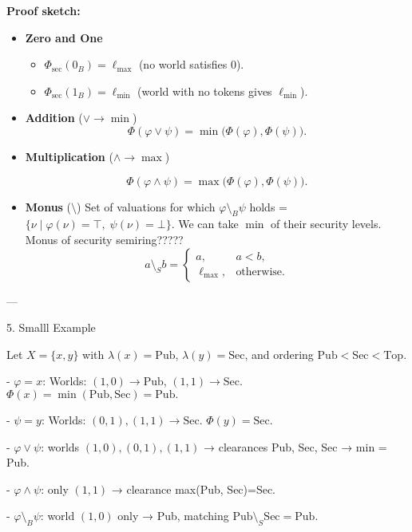 \textbf{Proof sketch:}
\begin{itemize}
    \item \textbf{Zero and One}  
        \begin{itemize}
            \item \(\Phi_{\mathrm{sec}}(0_B)=\ell_{\max}\) (no world satisfies 0).
            \item \(\Phi_{\mathrm{sec}}(1_B)=\ell_{\min}\) (world with no tokens gives \(\ell_{\min}\)).
        \end{itemize}
    \item \textbf{Addition} (\(\vee \to \min\))  
        \[
            \Phi(\varphi\vee\psi)
            = \min\bigl(\Phi(\varphi),\Phi(\psi)\bigr).
        \]
    \item \textbf{Multiplication} (\(\wedge \to \max\))  
        
        \[
            \Phi(\varphi\wedge\psi)
            = \max\bigl(\Phi(\varphi),\Phi(\psi)\bigr).
        \]
    \item \textbf{Monus} (\(\setminus\))  
        Set of valuations for which  \(\varphi\setminus_B\psi\) holds =  
        \(\{\nu \mid \varphi(\nu)=\top,\;\psi(\nu)=\bot\}\).  
        We can take \(\min\) of their security levels.
        Monus of security semiring?????
        \[
            a\setminus_S b =
            \begin{cases}
                a, & a<b,\\
                \ell_{\max}, &\text{otherwise}.
            \end{cases}
        \]
\end{itemize}

---

 5. Smalll Example

Let \(X=\{x,y\}\) with \(\lambda(x)=\mathrm{Pub}\), \(\lambda(y)=\mathrm{Sec}\),
and ordering \(\mathrm{Pub}<\mathrm{Sec}<\mathrm{Top}\).

- \(\varphi = x\):  
  Worlds: \((1,0)\to\mathrm{Pub}\), \((1,1)\to\mathrm{Sec}\).  
  \(\Phi(x)=\min(\mathrm{Pub},\mathrm{Sec})=\mathrm{Pub}.\)

- \(\psi = y\):  
  Worlds: \((0,1),(1,1)\to\mathrm{Sec}\).  
  \(\Phi(y)=\mathrm{Sec}.\)

- \(\varphi\vee\psi\): worlds \((1,0),(0,1),(1,1)\) → clearances Pub, Sec, Sec → min = Pub.

- \(\varphi\wedge\psi\): only \((1,1)\) → clearance max(Pub, Sec)=Sec.

- \(\varphi\setminus_B\psi\): world \((1,0)\) only → Pub, matching \(\mathrm{Pub}\setminus_S\mathrm{Sec}=\mathrm{Pub}.\)

